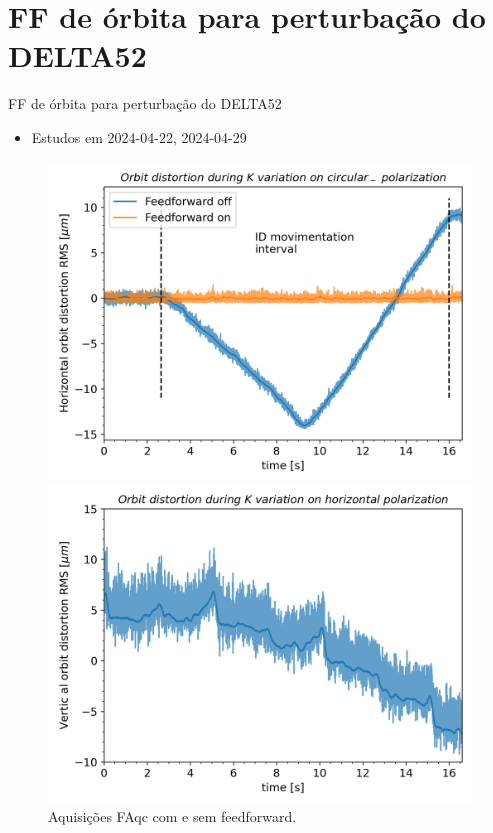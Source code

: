 \documentclass[aspectratio=169]{beamer}            %
\begin{document}
\section{FF de órbita para perturbação do DELTA52}

\begin{frame}{FF de órbita para perturbação do DELTA52}

\begin{itemize}
    \item Estudos em 2024-04-22, 2024-04-29
\end{itemize}
  \begin{figure}[ht]
        \begin{minipage}[b]{0.45\linewidth}
            \centering
            \includegraphics[width=\textwidth]{2024-05-31/figures/Orbit_dist_FAcq.png}
            \caption{Aquisições FAqc com e sem feedforward.}
            \label{fig:a}
        \end{minipage}
        \hspace{0.5cm}
        \begin{minipage}[b]{0.45\linewidth}
            \centering
            \includegraphics[width=\textwidth]{2024-05-31/figures/Orbit_dist_FAcq_bpm_disturb.png}

\end{minipage}
\end{figure}
\end{frame}
\end{document}
